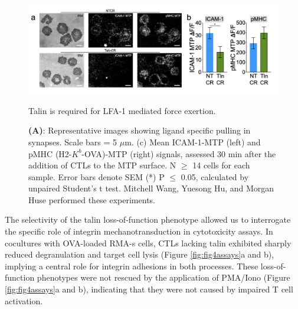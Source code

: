 \begin{figure}[htbp]
	\centering
	\includegraphics[width=1.0\columnwidth]{../figures/chapter3/fig4mtp.png}
	\caption{Talin is required for LFA-1 mediated force exertion.}
	\caption*{\textbf{(A)}: Representative images showing ligand specific pulling in synapses. Scale bars = 5 $\mu$m. (c) Mean ICAM-1-MTP (left) and pMHC (H2-$K^{b}$-OVA)-MTP (right) signals, assessed 30 min after the addition of CTLs to the MTP surface. N $\geq$ 14 cells for each sample.  Error bars denote SEM (*) P $\leq$ 0.05, calculated by unpaired Student’s t test. Mitchell Wang, Yuesong Hu, and Morgan Huse performed these experiments.}
	\label{fig:fig4mtp}
\end{figure} 

The selectivity of the talin loss-of-function phenotype allowed us to interrogate the specific role of integrin mechanotransduction in cytotoxicity assays. In cocultures with OVA-loaded RMA-s cells, CTLs lacking talin exhibited sharply reduced degranulation and target cell lysis (Figure \ref{fig:fig4assays}a and b), implying a central role for integrin adhesions in both processes. These loss-of-function phenotypes were not rescued by the application of PMA/Iono (Figure \ref{fig:fig4assays}a and b), indicating that they were not caused by impaired T cell activation. 

